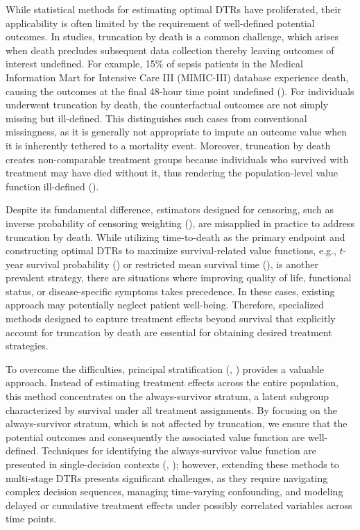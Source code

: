 \documentclass{article}
\newcommand{\tred}{{}}   %
\begin{document}
While statistical methods for estimating optimal DTRs have proliferated, their applicability is often limited by the requirement of well-defined potential outcomes. 
In studies, truncation by death is a common challenge, which arises when death precludes subsequent data collection thereby leaving outcomes of interest undefined. 
For example, 15\% of sepsis patients in the Medical Information Mart for Intensive Care III (MIMIC-III) database experience death, causing the outcomes at the final 48-hour time point undefined (\citealp{relive}). 
\tred{For individuals underwent truncation by death, the counterfactual outcomes are not simply missing but ill-defined. This distinguishes such cases from conventional missingness, as it is generally not appropriate to impute an outcome value when it is inherently tethered to a mortality event. }
Moreover, truncation by death creates non-comparable treatment groups because individuals who survived with treatment may have died without it, thus rendering the population-level value function ill-defined (\citealp{rubin2006causal}). 

Despite its fundamental difference, estimators designed for censoring, such as inverse probability of censoring weighting (\citealp{ipcwrobins2000}), are misapplied in practice to address truncation by death.
While utilizing time-to-death as the primary endpoint and constructing optimal DTRs to maximize survival-related value functions, e.g., $t$-year survival probability (\citealp{tyeardtr}) or restricted mean survival time (\citealp{relive}), is another prevalent strategy, there are situations where improving quality of life, functional status, or disease-specific symptoms takes precedence.
In these cases, existing approach may potentially neglect patient well-being.
Therefore, specialized methods designed to capture treatment effects beyond survival that explicitly account for truncation by death are essential for obtaining desired treatment strategies.

To overcome the difficulties, principal stratification (\citealp{ps1}, \citealp{ps2}) provides a valuable approach. Instead of estimating treatment effects across the entire population, this method concentrates on the always-survivor stratum, a latent subgroup characterized by survival under all treatment assignments. 
By focusing on the always-survivor stratum, which is not affected by truncation, we ensure that the potential outcomes and consequently the associated value function are well-defined. 
Techniques for identifying the always-survivor value function are presented in single-decision contexts (\citealp{chu23c}, \citealp{GROSSI2025}); however, extending these methods to multi-stage DTRs presents significant challenges, as they require navigating complex decision sequences, managing time-varying confounding, and modeling delayed or cumulative treatment effects under possibly correlated variables across time points.
\end{document}
